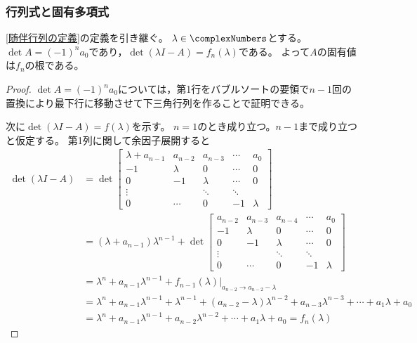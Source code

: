             \subsubsection{行列式と固有多項式}
                \label{随伴行列の行列式と固有多項式}
                \begin{shadebox}
                    \ref{随伴行列の定義}の定義を引き継ぐ。
                    $\lambda\in\complexNumbers$とする。
                    $\det{A}=(-1)^n a_0$であり，$\det{(\lambda I-A)} = f_n(\lambda)$である。
                    よって$A$の固有値は$f_n$の根である。
                \end{shadebox}
                \begin{proof}
                    $\det{A}=(-1)^n a_0$については，第1行をバブルソートの要領で$n-1$回の置換により最下行に移動させて下三角行列を作ることで証明できる。
                    \par
                    次に$\det{(\lambda I-A)} = f(\lambda)$を示す。
                    $n=1$のとき成り立つ。$n-1$まで成り立つと仮定する。
                    第1列に関して余因子展開すると
                    \begin{align*}
                        \det{(\lambda I-A)} &= \det
                        \begin{bmatrix}
                            \lambda+a_{n-1} & a_{n-2} & a_{n-3} & \cdots & a_0 \\
                            -1 & \lambda & 0 & \cdots & 0 \\
                            0 & -1 & \lambda & \cdots & 0 \\
                            \vdots & & \ddots & \ddots \\
                            0 & \cdots & 0 & -1 & \lambda
                        \end{bmatrix} \\
                        &= (\lambda+a_{n-1})\lambda^{n-1} + \det
                        \begin{bmatrix}
                            a_{n-2} & a_{n-3} & a_{n-4} & \cdots & a_0 \\
                            -1 & \lambda & 0 & \cdots & 0 \\
                            0 & -1 & \lambda & \cdots & 0 \\
                            \vdots & & \ddots & \ddots \\
                            0 & \cdots & 0 & -1 & \lambda
                        \end{bmatrix} \\
                        &= \lambda^{n} + a_{n-1}\lambda^{n-1} + \left.f_{n-1}(\lambda)\right|_{a_{n-2}\to a_{n-2}-\lambda} \\
                        &= \lambda^{n} + a_{n-1}\lambda^{n-1} + \lambda^{n-1} + (a_{n-2}-\lambda)\lambda^{n-2} + a_{n-3}\lambda^{n-3} + \dotsb + a_1\lambda + a_0 \\
                        &= \lambda^{n} + a_{n-1}\lambda^{n-1} + a_{n-2}\lambda^{n-2} + \dotsb + a_1\lambda + a_0 = f_n(\lambda)
                    \end{align*}
                \end{proof}
